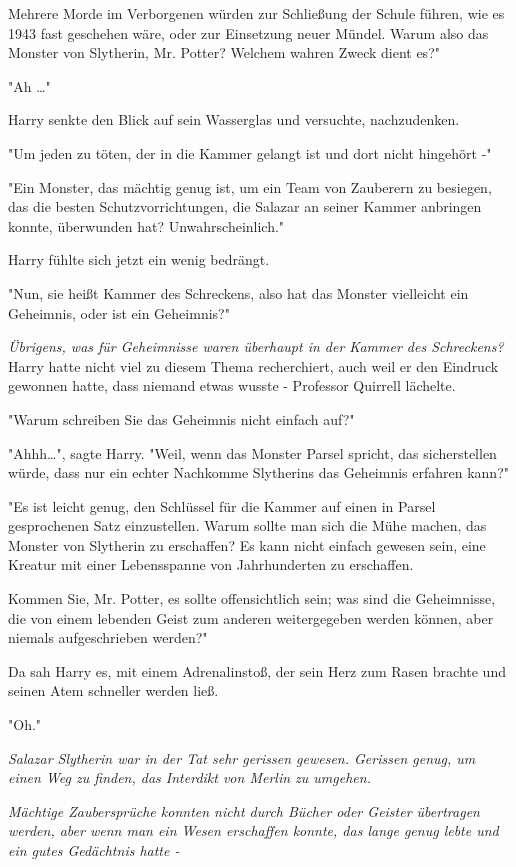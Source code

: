 {Mehrere Morde im Verborgenen würden zur Schließung der Schule führen, wie es 1943 fast geschehen wäre, oder zur Einsetzung neuer Mündel. Warum also das Monster von Slytherin, Mr. Potter? Welchem wahren Zweck dient es?"

"Ah …"

Harry senkte den Blick auf sein Wasserglas und versuchte, nachzudenken.

"Um jeden zu töten, der in die Kammer gelangt ist und dort nicht hingehört -"

"Ein Monster, das mächtig genug ist, um ein Team von Zauberern zu besiegen, das die besten Schutzvorrichtungen, die Salazar an seiner Kammer anbringen konnte, überwunden hat? Unwahrscheinlich."

Harry fühlte sich jetzt ein wenig bedrängt.

"Nun, sie heißt Kammer des Schreckens, also hat das Monster vielleicht ein Geheimnis, oder ist ein Geheimnis?"

\emph{Übrigens, was für Geheimnisse waren überhaupt in der Kammer des Schreckens?} Harry hatte nicht viel zu diesem Thema recherchiert, auch weil er den Eindruck gewonnen hatte, dass niemand etwas wusste - Professor Quirrell lächelte.

"Warum schreiben Sie das Geheimnis nicht einfach auf?"

"Ahhh…", sagte Harry. "Weil, wenn das Monster Parsel spricht, das sicherstellen würde, dass nur ein echter Nachkomme Slytherins das Geheimnis erfahren kann?"

"Es ist leicht genug, den Schlüssel für die Kammer auf einen in Parsel gesprochenen Satz einzustellen. Warum sollte man sich die Mühe machen, das Monster von Slytherin zu erschaffen? Es kann nicht einfach gewesen sein, eine Kreatur mit einer Lebensspanne von Jahrhunderten zu erschaffen.

Kommen Sie, Mr. Potter, es sollte offensichtlich sein; was sind die Geheimnisse, die von einem lebenden Geist zum anderen weitergegeben werden können, aber niemals aufgeschrieben werden?"

Da sah Harry es, mit einem Adrenalinstoß, der sein Herz zum Rasen brachte und seinen Atem schneller werden ließ.

"Oh."

\emph{Salazar Slytherin war in der Tat sehr gerissen gewesen. Gerissen genug, um einen Weg zu finden, das Interdikt von Merlin zu umgehen.}

\emph{Mächtige Zaubersprüche konnten nicht durch Bücher oder Geister übertragen werden, aber wenn man ein Wesen erschaffen konnte, das lange genug lebte und ein gutes Gedächtnis hatte -}

}
